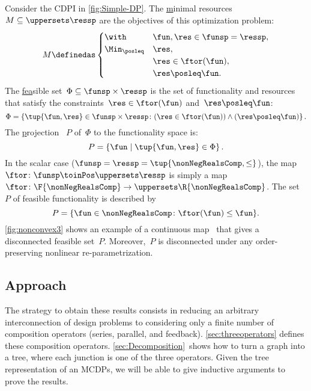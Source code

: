 \begin{example}
  \label{exa:one}
  Consider the CDPI in \cref{fig:Simple-DP}.
  The \uline{m}inimal resources~$M\subseteq\uppersets \ressp$ are the objectives of this optimization problem:
  \begin{equation*}
    M\definedas\begin{cases}
                 \with & \fun,\res\in\funsp=\ressp,\\
                 \Min_{\posleq} & \res,\\
                 & \res\in\ftor(\fun),\\
                 & \res\posleq\fun.
    \end{cases}
  \end{equation*}
  The \uline{fea}sible  set~$\Phi\subseteq\funsp\times\ressp$ is
  the set of functionality and resources that satisfy the constraints~$\res\in\ftor(\fun)$
  and~$\res\posleq\fun$:
  \begin{equation}
    \Phi=\left\{ \tup{\fun,\res}\in\funsp\times\ressp\colon (\res\in\ftor(\fun))\wedge(\res\posleq\fun)\right\} .\label{eq:feasible}
  \end{equation}
  The \uline{p}rojection  ~$P$ of~$\Phi$ to the functionality space
  is:
  \begin{equation*}
    P=\left\{ \fun\mid\tup{\fun,\res} \in\Phi\right\}.
  \end{equation*}
  In the scalar case ($\funsp=\ressp=\tup{\nonNegRealsComp,\leq}$),
  the map~$\ftor\colon\funsp\toinPos\uppersets \ressp$ is simply a map~$\ftor\colon\F{\nonNegRealsComp}\to \uppersets\R{\nonNegRealsComp}$.
  The set~$P$ of feasible functionality is described by
  \begin{equation}
    P=\{\fun\in\nonNegRealsComp\colon \ftor(\fun)\leq\fun\}.\label{eq:Pfeasible}
  \end{equation}
  \cref{fig:nonconvex3} shows an example of a continuous map~\ftor
  that gives a disconnected feasible set~$P$. Moreover,~$P$ is disconnected
  under any order-preserving nonlinear re-parametrization.

\end{example}

\subsection{Approach}

The strategy to obtain these results  consists in reducing an arbitrary
interconnection of design problems to considering only a finite
number of composition operators (series, parallel, and feedback).
\cref{sec:threeoperators} defines these composition operators. \cref{sec:Decomposition}~shows
how to turn a graph into a tree, where each junction is one of the
three operators. Given the tree representation of an MCDPs, we will
be able to give inductive arguments to prove the results.

